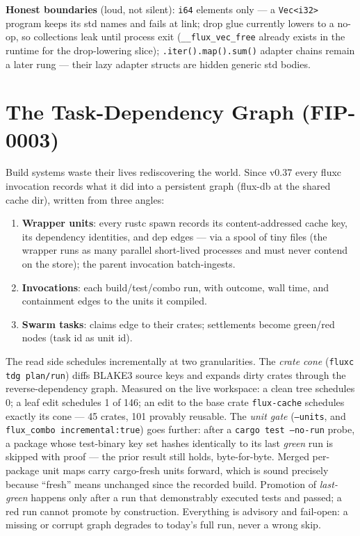 \documentclass[11pt]{article}
\begin{document}
\textbf{Honest boundaries} (loud, not silent): \texttt{i64} elements only ---
a \texttt{Vec<i32>} program keeps its std names and fails at link; drop glue
currently lowers to a no-op, so collections leak until process exit
(\texttt{\_\_flux\_vec\_free} already exists in the runtime for the
drop-lowering slice); \texttt{.iter().map().sum()} adapter chains remain a
later rung --- their lazy adapter structs are hidden generic std bodies.

\section{The Task-Dependency Graph (FIP-0003)}\label{sec:tdg}
Build systems waste their lives rediscovering the world. Since v0.37 every
fluxc invocation records what it did into a persistent graph (flux-db at the
shared cache dir), written from three angles:

\begin{enumerate}
\item \textbf{Wrapper units}: every rustc spawn records its content-addressed
cache key, its dependency identities, and dep edges --- via a spool of tiny
files (the wrapper runs as many parallel short-lived processes and must never
contend on the store); the parent invocation batch-ingests.
\item \textbf{Invocations}: each build/test/combo run, with outcome, wall time,
and containment edges to the units it compiled.
\item \textbf{Swarm tasks}: claims edge to their crates; settlements become
green/red nodes (task id as unit id).
\end{enumerate}

The read side schedules incrementally at two granularities. The \emph{crate
cone} (\texttt{fluxc tdg plan/run}) diffs BLAKE3 source keys and expands dirty
crates through the reverse-dependency graph. Measured on the live workspace:
a clean tree schedules 0; a leaf edit schedules 1 of 146; an edit to the base
crate \texttt{flux-cache} schedules exactly its cone --- 45 crates, 101
provably reusable. The \emph{unit gate} (\texttt{--units}, and
\texttt{flux\_combo incremental:true}) goes further: after a
\texttt{cargo test --no-run} probe, a package whose test-binary key set hashes
identically to its last \emph{green} run is skipped with proof --- the prior
result still holds, byte-for-byte. Merged per-package unit maps carry
cargo-fresh units forward, which is sound precisely because ``fresh'' means
unchanged since the recorded build. Promotion of \emph{last-green} happens only
after a run that demonstrably executed tests and passed; a red run cannot
promote by construction. Everything is advisory and fail-open: a missing or
corrupt graph degrades to today's full run, never a wrong skip.
\end{document}
